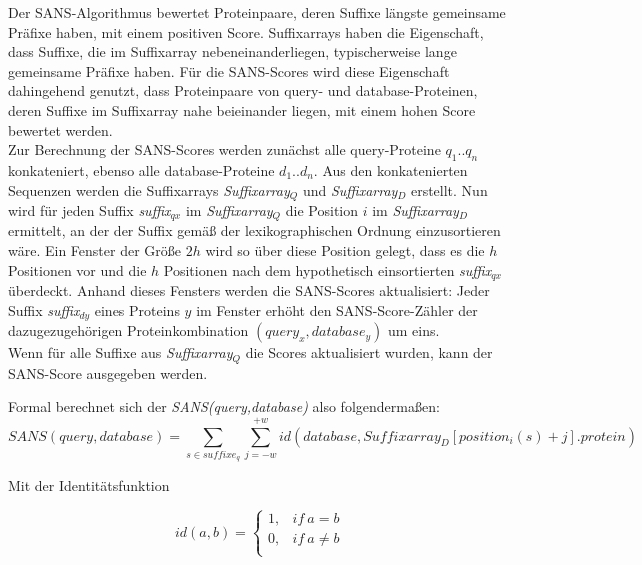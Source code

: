 \documentclass{article}
\begin{document}
Der SANS-Algorithmus bewertet Proteinpaare, deren Suffixe längste gemeinsame
Präfixe haben, mit einem positiven Score. Suffixarrays haben die Eigenschaft,
dass Suffixe, die im Suffixarray nebeneinanderliegen, typischerweise lange
gemeinsame Präfixe haben. Für die SANS-Scores wird diese Eigenschaft dahingehend
genutzt, dass Proteinpaare von query- und database-Proteinen, deren Suffixe im
Suffixarray nahe beieinander liegen, mit einem hohen Score bewertet werden.\\
Zur Berechnung der SANS-Scores werden zunächst alle query-Proteine $q_1..q_n$ konkateniert, ebenso alle database-Proteine $d_1..d_n$. 
Aus den konkatenierten Sequenzen werden die Suffixarrays \emph{Suffixarray$_Q$} und \emph{Suffixarray$_D$} erstellt. 
Nun wird für jeden Suffix \emph{suffix$_{qx}$} im \emph{Suffixarray$_Q$} die
Position $i$ im \emph{Suffixarray$_D$} ermittelt, an der der Suffix gemäß der lexikographischen Ordnung einzusortieren wäre. 
Ein Fenster der Größe $2h$ wird so über diese Position gelegt, dass es die $h$
Positionen vor und die $h$ Positionen nach dem hypothetisch einsortierten
\emph{suffix$_{qx}$} überdeckt. 
Anhand dieses Fensters werden die SANS-Scores aktualisiert: 
Jeder Suffix \emph{suffix$_{dy}$} eines Proteins $y$ im Fenster erhöht den SANS-Score-Zähler der dazugezugehörigen Proteinkombination $(query_x,database_y)$ um eins. \\
Wenn für alle Suffixe aus \emph{Suffixarray$_Q$} die Scores aktualisiert wurden, kann der SANS-Score ausgegeben werden.

Formal berechnet sich der \emph{SANS(query,database)} also folgendermaßen:\\

\begin{equation}
SANS(query,database) = \sum_{s \in suffixe_q} \sum_{j=-w}^{+w} id(database,Suffixarray_D[position_i(s)  +j].protein) 
\end{equation}

Mit der Identitätsfunktion

\begin{equation}
id(a,b)=\begin{cases}
  1,  & if~a=b\\
  0,  & if~a\ne b\\
\end{cases}
\end{equation}
\end{document}
